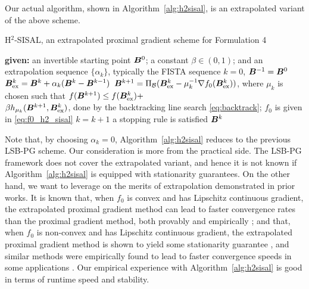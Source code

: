 \documentclass[10pt,twocolumn,twoside]{IEEEtran}
\begin{document}
Our actual algorithm, shown in Algorithm~\ref{alg:h2sisal}, is an extrapolated variant of the above scheme.
\begin{algorithm}[hbt!]
	\caption{H$^2$-SISAL, an extrapolated proximal gradient scheme for Formulation 4} \label{alg:h2sisal}
	\begin{algorithmic}[1]
		\STATE \textbf{given:} an invertible starting point ${\bm B}^0$; a constant $\beta \in (0,1)$; and an extrapolation sequence $\{ \alpha_k \}$, typically the FISTA sequence \cite{beck2017first}
		\STATE $k= 0$, ${\bm B}^{-1} = {\bm B}^0$
		\STATE \hspace{1em} ${\bm B}_{\rm ex}^k = {\bm B}^k + \alpha_k ( {\bm B}^k - {\bm B}^{k-1} )$
		\STATE \hspace{1em} ${\bm B}^{k+1} = \Pi_{\mathcal{B}}( {\bm B}^k_{\rm ex} - \mu_k^{-1} \nabla f_0({\bm B}^k_{\rm ex}) )$, where $\mu_k$ is chosen such that $f({\bm B}^{k+1}) \leq f({\bm B}_{\rm ex}^k) + $\\
		\STATE \hspace{1em} $\beta h_{\mu_k}( {\bm B}^{k+1}, {\bm B}^k_{\rm ex})$, done by the backtracking line search \eqref{eq:backtrack}; $f_0$ is given in \eqref{eq:f0_h2_sisal}
		\STATE \hspace{1em} $k= k+1$
		 a stopping rule is satisfied
		 ${\bm B}^k$
	\end{algorithmic}
\end{algorithm}
Note that, by choosing $\alpha_k = 0$, Algorithm~\ref{alg:h2sisal} reduces to the previous LSB-PG scheme.
Our consideration is more from the practical side.
The LSB-PG framework does not cover the extrapolated variant, and hence it is not known if Algorithm~\ref{alg:h2sisal} is equipped with stationarity guarantees.
On the other hand, we want to leverage on the merits of extrapolation demonstrated in prior works.
It is known that, when $f_0$ is convex and has Lipschitz continuous gradient, the extrapolated proximal gradient method can lead to faster convergence rates than the proximal gradient method, both provably and empirically \cite{beck2009fast};
and that, when $f_0$ is non-convex and has Lipschitz continuous gradient,  the extrapolated proximal gradient method is shown to yield some stationarity guarantee \cite{ghadimi2016accelerated,xu2017globally}, and similar methods were empirically found to lead to faster convergence speeds in some applications \cite{xu2013block,shao2019framework,wu2020hybrid,fu2016robust}.
Our empirical experience with Algorithm~\ref{alg:h2sisal} is good in terms of runtime speed and stability.
\end{document}
